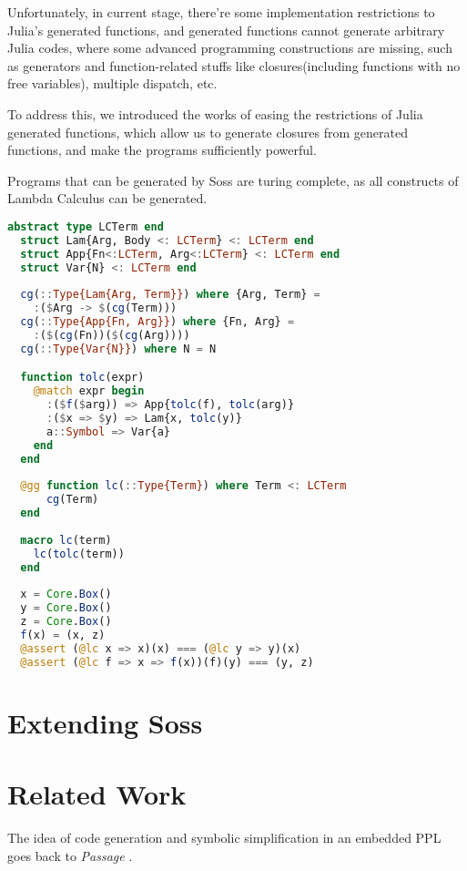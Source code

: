 \documentclass[anonymous=false, %
               format=acmsmall, %
               review=true, %
               screen=true, %
               nonacm=true]{acmart}
\begin{document}
Unfortunately, in current stage, there're some implementation restrictions to Julia's generated functions, and generated functions cannot generate arbitrary Julia codes,
where some advanced programming constructions are missing, such as generators and function-related stuffs like closures(including functions with no free variables), multiple dispatch, etc.

To address this, we introduced the works of easing the restrictions of Julia generated functions,
which allow us to generate closures from generated functions, and make the programs sufficiently powerful.

Programs that can be generated by Soss are turing complete, as all constructs of Lambda Calculus can be generated.

\begin{lstlisting}[language = Julia]
  abstract type LCTerm end
  struct Lam{Arg, Body <: LCTerm} <: LCTerm end
  struct App{Fn<:LCTerm, Arg<:LCTerm} <: LCTerm end
  struct Var{N} <: LCTerm end
  
  cg(::Type{Lam{Arg, Term}}) where {Arg, Term} = 
    :($Arg -> $(cg(Term)))
  cg(::Type{App{Fn, Arg}}) where {Fn, Arg} = 
    :($(cg(Fn))($(cg(Arg))))
  cg(::Type{Var{N}}) where N = N

  function tolc(expr)
    @match expr begin
      :($f($arg)) => App{tolc(f), tolc(arg)}
      :($x => $y) => Lam{x, tolc(y)}
      a::Symbol => Var{a}
    end
  end
  
  @gg function lc(::Type{Term}) where Term <: LCTerm
      cg(Term)
  end
  
  macro lc(term)
    lc(tolc(term))
  end
  
  x = Core.Box()
  y = Core.Box()
  z = Core.Box()
  f(x) = (x, z)
  @assert (@lc x => x)(x) === (@lc y => y)(x)
  @assert (@lc f => x => f(x))(f)(y) === (y, z)
  \end{lstlisting} 



\section{Extending Soss}

\section{Related Work}

The idea of code generation and symbolic simplification in an embedded PPL goes back to \emph{Passage} \cite{Scherrer2012}. 
\end{document}
